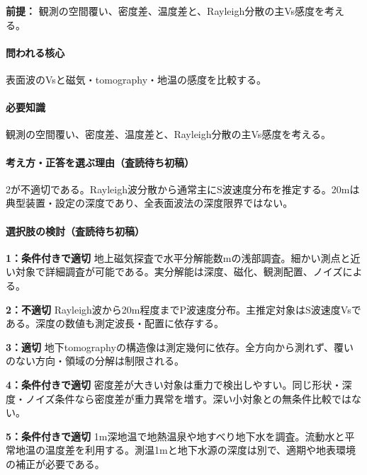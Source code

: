 \noindent\textbf{前提：} 観測の空間覆い、密度差、温度差と、Rayleigh分散の主Vs感度を考える。\par

\paragraph{問われる核心} 表面波のVsと磁気・tomography・地温の感度を比較する。

\paragraph{必要知識} 観測の空間覆い、密度差、温度差と、Rayleigh分散の主Vs感度を考える。

\paragraph{考え方・正答を選ぶ理由（査読待ち初稿）} 2が不適切である。Rayleigh波分散から通常主にS波速度分布を推定する。20mは典型装置・設定の深度であり、全表面波法の深度限界ではない。

\paragraph{選択肢の検討（査読待ち初稿）}\mbox{}\par

\noindent\textbf{1：条件付きで適切} 地上磁気探査で水平分解能数mの浅部調査。細かい測点と近い対象で詳細調査が可能である。実分解能は深度、磁化、観測配置、ノイズによる。\par

\noindent\textbf{2：不適切} Rayleigh波から20m程度までP波速度分布。主推定対象はS波速度Vsである。深度の数値も測定波長・配置に依存する。\par

\noindent\textbf{3：適切} 地下tomographyの構造像は測定幾何に依存。全方向から測れず、覆いのない方向・領域の分解は制限される。\par

\noindent\textbf{4：条件付きで適切} 密度差が大きい対象は重力で検出しやすい。同じ形状・深度・ノイズ条件なら密度差が重力異常を増す。深い小対象との無条件比較ではない。\par

\noindent\textbf{5：条件付きで適切} 1m深地温で地熱温泉や地すべり地下水を調査。流動水と平常地温の温度差を利用する。測温1mと地下水源の深度は別で、適期や地表環境の補正が必要である。\par

